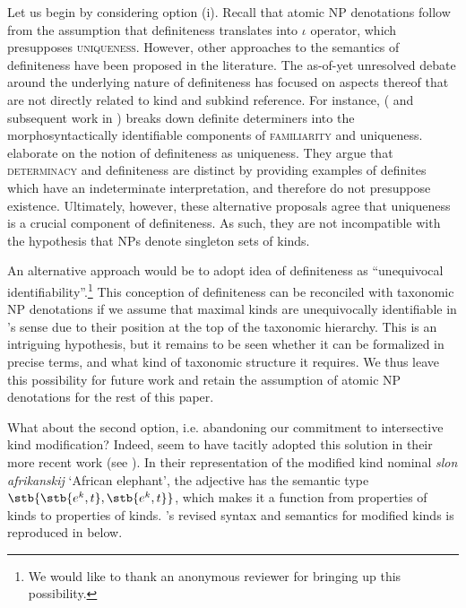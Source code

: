 \documentclass[output=paper]{langscibook}
\begin{document}
Let us begin by considering option (i). Recall that atomic NP denotations follow from the assumption that definiteness translates into  $\iota$ operator, which presupposes \textsc{uniqueness}. However, other approaches to the semantics of definiteness have been proposed in the literature. The as-of-yet unresolved debate around the underlying nature of definiteness has focused on aspects thereof that are not directly related to kind and subkind reference. For instance, \citeauthor{Schwarz2009} (\citeyear{Schwarz2009} and subsequent work in \citeyear{Schwarz2013}) breaks down definite determiners into the morphosyntactically identifiable components of \textsc{familiarity} and uniqueness. \citet{Coppock.Beaver2014,Coppock.Beaver2015} elaborate on the notion of definiteness as uniqueness. They argue that \textsc{determinacy} and definiteness are distinct by providing examples of definites which have an indeterminate interpretation, and therefore do not presuppose existence. Ultimately, however, these alternative proposals agree that uniqueness is a crucial component of definiteness. As such, they are not incompatible with the hypothesis that NPs denote singleton sets of kinds.

An alternative approach would be to adopt  idea of definiteness as ``unequivocal identifiability''.\footnote{We would like to thank an anonymous reviewer for bringing up this possibility.} This conception of definiteness can be reconciled with taxonomic NP denotations if we assume that maximal kinds are unequivocally identifiable in \citeauthor{Lobner1985}'s sense due to their position at the top of the taxonomic hierarchy. This is an intriguing hypothesis, but it remains to be seen whether it can be formalized in precise terms, and what kind of taxonomic structure it requires. We thus leave this possibility for future work and retain the assumption of atomic NP denotations for the rest of this paper.

What about the second option, i.e. abandoning our commitment to intersective kind modification? Indeed, \citeauthor{Borik.Espinal2012} seem to have tacitly adopted this solution in their more recent work (see \citealt{Borik.Espinal2018, Borik.Espinal2016}). In their representation of the  modified kind nominal \textit{slon afrikanskij} `African elephant', the adjective has the semantic type $\stb{\stb{e^k,t},\stb{e^k,t}}$, which makes it a function from properties of kinds to properties of kinds. \citeauthor{Borik.Espinal2012}'s revised syntax and semantics for modified kinds is reproduced in  below.
\end{document}
